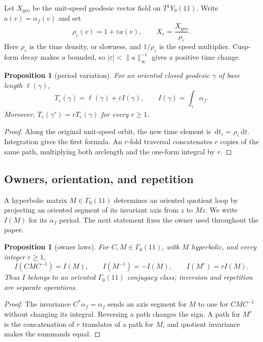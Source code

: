 \documentclass[11pt]{article}
\newtheorem{proposition}[theorem]{Proposition}
\theoremstyle{definition}
\theoremstyle{remark}
\newcommand{\G}{\Gamma_0(11)}
\newcommand{\e}{\varepsilon}
\newcommand{\dd}{\,\mathrm d}
\begin{document}
Let $X_{\mathrm{geo}}$ be the unit-speed geodesic vector field on $T^1Y_0(11)$. Write $a(v)=\alpha_f(v)$ and set
\[
\rho_\e(v)=1+\e a(v),
\qquad
X_\e=\frac{X_{\mathrm{geo}}}{\rho_\e}.
\]
Here $\rho_\e$ is the time density, or slowness, and $1/\rho_\e$ is the speed multiplier. Cusp-form decay makes $a$ bounded, so $|\e|<\lVert a\rVert_\infty^{-1}$ gives a positive time change.

\begin{proposition}[period variation]\label{prop:period}
For an oriented closed geodesic $\gamma$ of base length $\ell(\gamma)$,
\[
T_\e(\gamma)=\ell(\gamma)+\e I(\gamma),
\qquad
I(\gamma)=\int_\gamma\alpha_f.
\]
Moreover, $T_\e(\gamma^r)=rT_\e(\gamma)$ for every $r\geq1$.
\end{proposition}

\begin{proof}
Along the original unit-speed orbit, the new time element is $\dd t_\e=\rho_\e\dd t$. Integration gives the first formula. An $r$-fold traversal concatenates $r$ copies of the same path, multiplying both arclength and the one-form integral by $r$.
\end{proof}

\subsection{Owners, orientation, and repetition}

A hyperbolic matrix $M\in\G$ determines an oriented quotient loop by projecting an oriented segment of its invariant axis from $z$ to $Mz$. We write $I(M)$ for its $\alpha_f$ period. The next statement fixes the owner used throughout the paper.

\begin{proposition}[owner laws]\label{prop:owner}
For $C,M\in\G$, with $M$ hyperbolic, and every integer $r\geq1$,
\[
I(CMC^{-1})=I(M),\qquad I(M^{-1})=-I(M),\qquad I(M^r)=rI(M).
\]
Thus $I$ belongs to an oriented $\G$ conjugacy class; inversion and repetition are separate operations.
\end{proposition}

\begin{proof}
The invariance $C^*\alpha_f=\alpha_f$ sends an axis segment for $M$ to one for $CMC^{-1}$ without changing its integral. Reversing a path changes the sign. A path for $M^r$ is the concatenation of $r$ translates of a path for $M$, and quotient invariance makes the summands equal.
\end{proof}
\end{document}

